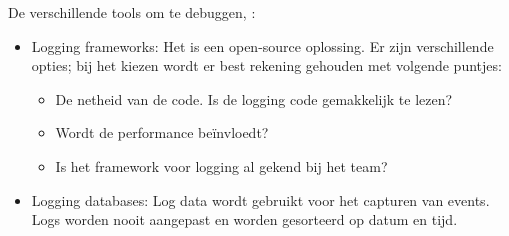 De verschillende tools om te debuggen, \textcite{Swersky2019}:
\begin{itemize}
	\item Logging frameworks: Het is een open-source oplossing. Er zijn verschillende opties; bij het kiezen wordt er best rekening gehouden met volgende puntjes:
		\begin{itemize}
			\item De netheid van de code. Is de logging code gemakkelijk te lezen?
			\item Wordt de performance beïnvloedt?
			\item Is het framework voor logging al gekend bij het team?
		\end{itemize}
	\item Logging databases: Log data wordt gebruikt voor het capturen van events. Logs worden nooit aangepast en worden gesorteerd op datum en tijd. 
\end{itemize}



